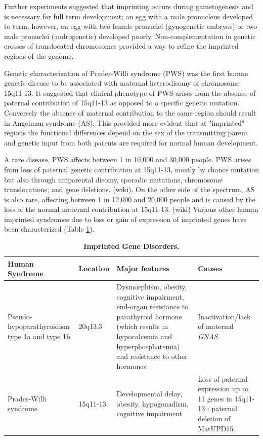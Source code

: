 Further experiments suggested that imprinting occurs during gametogenesis and is necessary for full term development; an egg with a male pronucleus developed to term, however, an egg with two female pronuclei (gynogenetic embryos) or two male pronuclei (androgenetic) developed poorly\cite{Surani1984,McGrath:1984ky}. Non-complementation in genetic crosses of translocated chromosomes provided a way to refine the imprinted regions of the genome\cite{Cattanach:1985hu}. 

Genetic characterization of Prader-Willi syndrome (PWS) was the first human genetic disease to be associated with maternal heterodisomy of chromosome 15q11-13\cite{Nicholls:vh}. It suggested that  clinical phenotype of PWS arises from the absence of paternal contribution of 15q11-13 as opposed to a specific genetic mutation. Conversely the absence of maternal contribution to the same region should result in Angelman syndrome (AS)\cite{Nicholls:vh,Reik:1989el}. This provided more evident that at "imprinted" regions the functional differences depend on the sex of the transmitting parent and genetic input from both parents are required for normal human development\cite{Nicholls:vh}.

A rare disease, PWS affects between 1 in 10,000 and 30,000 people. PWS arises from loss of paternal genetic contribution at 15q11-13, mostly by chance mutation but also through uniparental disomy, sporadic mutations, chromosome translocations, and gene deletions. (wiki). On the other side of the spectrum, AS is also rare, affecting between 1 in 12,000 and 20,000 people and is caused by the loss of the normal maternal contribution at 15q11-13. (wiki) Various other human imprinted syndromes due to loss or gain of expression of imprinted genes have been characterized (Table \ref{tab:imprinteddisease}). \cite{Peters2014}


\begin{table}
\centering
\begin{tabular}{@{}llll@{}}
\toprule Human Syndrome & Location & Major features & Causes \\ \midrule 
Pseudo-hypoparathyroidism type 1a and type 1b  & 20q13.3 & Dysmorphism, obesity, cognitive impairment, end-organ resistance to parathyroid hormone (which results in hypocalcemia and hyperphosphatemia) and resistance to other hormones & Inactivation/lack of maternal \emph{GNAS} \\ 
Prader-Willi syndrome & 15q11-13 & Developmental delay, obesity, hypogonadism, cognitive impairment & Loss of paternal expression up to 11 genes in 15q11-13 : paternal deletion of MatUPD15\\  \bottomrule
\end{tabular}
\caption[Imprinted Gene Disorders.]{\textbf{Imprinted Gene Disorders.}}
\label{tab:imprinteddisease}
\end{table}



